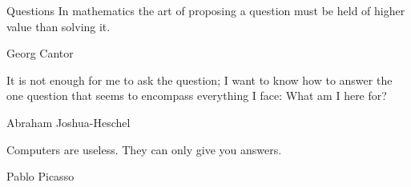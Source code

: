 \documentclass[
  9pt
  , table
  , ignorenonframetext
]{beamer}
\begin{document}
\begin{frame}{Questions}
  In mathematics the art of proposing a question must be held of higher value than solving it.\\
  \begin{flushright}
    Georg Cantor
  \end{flushright}

  It is not enough for me to ask the question; I want to know how to answer the one question that seems to encompass everything I face: What am I here for?
   \begin{flushright}
    Abraham Joshua-Heschel
   \end{flushright}

   Computers are useless. They can only give you answers.
   \begin{flushright}
     Pablo Picasso 
   \end{flushright}

\end{frame}







\end{document}
